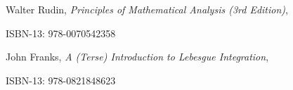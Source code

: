 \newpage
\begin{thebibliography}{8}
    Walter Rudin, \emph{Principles of Mathematical Analysis (3rd Edition)},

        ISBN-13: 978-0070542358

    John Franks, \emph{A (Terse) Introduction to Lebesgue Integration},

        ISBN-13: 978-0821848623
\end{thebibliography}

